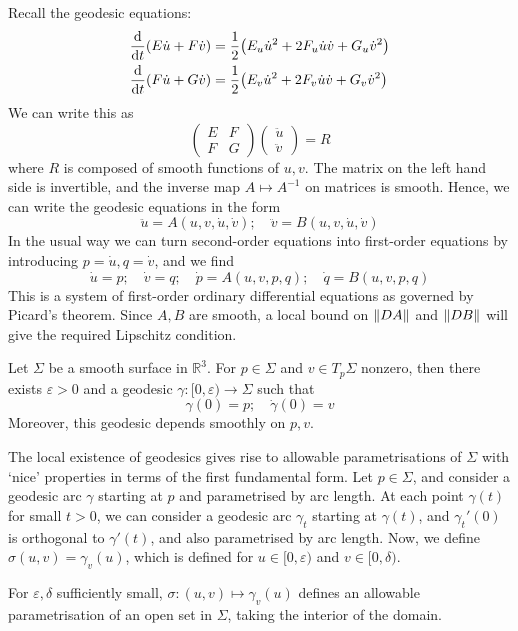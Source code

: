 Recall the geodesic equations:
\begin{align*}
	\dv{t} \qty(E \dot u + F \dot v) &= \frac{1}{2} \qty( E_u \dot u^2 + 2F_u \dot u \dot v + G_u \dot v^2 ) \\
	\dv{t} \qty(F \dot u + G \dot v) &= \frac{1}{2} \qty( E_v \dot u^2 + 2F_v \dot u \dot v + G_v \dot v^2 )
\end{align*}
We can write this as
\[ \begin{pmatrix}
	E & F \\
	F & G
\end{pmatrix} \begin{pmatrix}
	\ddot u \\
	\ddot v
\end{pmatrix}= R \]
where \( R \) is composed of smooth functions of \( u,v \).
The matrix on the left hand side is invertible, and the inverse map \( A \mapsto A^{-1} \) on matrices is smooth.
Hence, we can write the geodesic equations in the form
\[ \ddot u = A(u, v, \dot u, \dot v);\quad \ddot v = B(u, v, \dot u, \dot v) \]
In the usual way we can turn second-order equations into first-order equations by introducing \( p = \dot u, q = \dot v \), and we find
\[ \dot u = p;\quad \dot v = q;\quad \dot p = A(u,v,p,q);\quad \dot q = B(u,v,p,q) \]
This is a system of first-order ordinary differential equations as governed by Picard's theorem.
Since \( A, B \) are smooth, a local bound on \( \norm{DA} \) and \( \norm{DB} \) will give the required Lipschitz condition.
\begin{corollary}
	Let \( \Sigma \) be a smooth surface in \( \mathbb R^3 \).
	For \( p \in \Sigma \) and \( v \in T_p \Sigma \) nonzero, then there exists \( \varepsilon > 0 \) and a geodesic \( \gamma \colon [0,\varepsilon) \to \Sigma \) such that
	\[ \gamma(0) = p;\quad \dot \gamma(0) = v \]
	Moreover, this geodesic depends smoothly on \( p,v \).
\end{corollary}
The local existence of geodesics gives rise to allowable parametrisations of \( \Sigma \) with `nice' properties in terms of the first fundamental form.
Let \( p \in \Sigma \), and consider a geodesic arc \( \gamma \) starting at \( p \) and parametrised by arc length.
At each point \( \gamma(t) \) for small \( t > 0 \), we can consider a geodesic arc \( \gamma_t \) starting at \( \gamma(t) \), and \( \gamma_t'(0) \) is orthogonal to \( \gamma'(t) \), and also parametrised by arc length.
Now, we define \( \sigma(u,v) = \gamma_v(u) \), which is defined for \( u \in [0,\varepsilon) \) and \( v \in [0,\delta) \).
\begin{lemma}
	For \( \varepsilon, \delta \) sufficiently small, \( \sigma \colon (u,v) \mapsto \gamma_v(u) \) defines an allowable parametrisation of an open set in \( \Sigma \), taking the interior of the domain.
\end{lemma}
